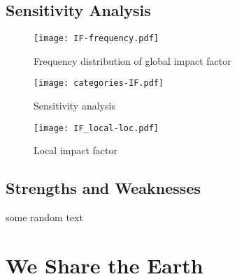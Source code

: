\documentclass[12pt]{article}
\begin{document}
	\subsection{Sensitivity Analysis}
	
		\begin{figure}[htbp]
			\centering
			\texttt{[image: IF-frequency.pdf]}
			\caption{Frequency distribution of global impact factor}
			\label{fig:freqIF}
		\end{figure}
	
		\begin{figure}[htbp]
			\centering
			\texttt{[image: categories-IF.pdf]}
			\caption{Sensitivity analysis}
			\label{fig:IFfactors}
		\end{figure}
		
		\begin{figure}[htbp]
			\centering
			\texttt{[image: IF\_local-loc.pdf]}
			\caption{Local impact factor}
			\label{fig:IFLocal}
		\end{figure}
		
	\subsection{Strengths and Weaknesses}

		some random text
	
\section*{We Share the Earth}



\newrefcontext
\printbibliography
\end{document}
